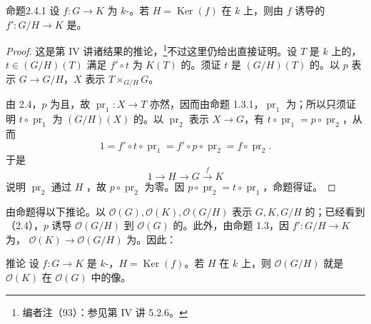 \begin{SGAresult}{命题}{2.4.1}
设 $f:G\to K$ 为 $k$-。若 $H=\operatorname{Ker}(f)$ 在 $k$ 上，则由 $f$ 诱导的 $f':G/H\to K$ 是。
\end{SGAresult}
\begin{proof}
这是第 IV 讲诸结果的推论，\footnote{编者注（93）：参见第 IV 讲 5.2.6。}不过这里仍给出直接证明。设 $T$ 是 $k$ 上的，$t\in(G/H)(T)$ 满足 $f'\circ t$ 为 $K(T)$ 的。须证 $t$ 是 $(G/H)(T)$ 的。以 $p$ 表示 $G\to G/H$，$X$ 表示 $T\times_{G/H}G$。

由 2.4，$p$ 为且，故 $\operatorname{pr}_1:X\to T$ 亦然，因而由命题 1.3.1，$\operatorname{pr}_1$ 为；所以只须证明 $t\circ\operatorname{pr}_1$ 为 $(G/H)(X)$ 的。以 $\operatorname{pr}_2$ 表示 $X\to G$，有 $t\circ\operatorname{pr}_1=p\circ\operatorname{pr}_2$，从而
\[
1=f'\circ t\circ\operatorname{pr}_1=f'\circ p\circ\operatorname{pr}_2=f\circ\operatorname{pr}_2.
\]
于是
\[
1\longrightarrow H\longrightarrow G\xrightarrow{f}K
\]
说明 $\operatorname{pr}_2$ 通过 $H$ ，故 $p\circ\operatorname{pr}_2$ 为零。因 $p\circ\operatorname{pr}_2=t\circ\operatorname{pr}_1$，命题得证。
\end{proof}
由命题得以下推论。以 $\mathscr O(G),\mathscr O(K),\mathscr O(G/H)$ 表示 $G,K,G/H$ 的；已经看到（2.4），$p$ 诱导 $\mathscr O(G/H)$ 到 $\mathscr O(G)$ 的。此外，由命题 1.3，因 $f':G/H\to K$ 为， $\mathscr O(K)\to\mathscr O(G/H)$ 为。因此：
\begin{SGAresult}{推论}{}
设 $f:G\to K$ 是 $k$-，$H=\operatorname{Ker}(f)$。若 $H$ 在 $k$ 上，则 $\mathscr O(G/H)$ 就是 $\mathscr O(K)$ 在 $\mathscr O(G)$ 中的像。
\end{SGAresult}

